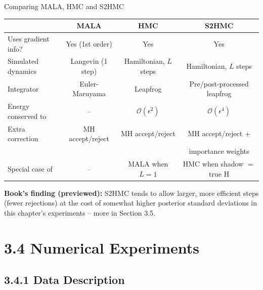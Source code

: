 \documentclass[aspectratio=169,10pt]{beamer}
\newcommand{\Ham}{\mathrm{H}}
\begin{document}
\begin{frame}{Comparing MALA, HMC and S2HMC}
  \begin{table}[]
    \small
    \centering
    \begin{tabular}{lccc}
      \toprule
      & MALA & HMC & S2HMC \\
      \midrule
      Uses gradient info? & Yes (1st order) & Yes & Yes \\
      Simulated dynamics & Langevin (1 step) & Hamiltonian, $L$ steps & Hamiltonian, $L$ steps \\
      Integrator & Euler-Maruyama & Leapfrog & Pre/post-processed leapfrog \\
      Energy conserved to & -- & $\mathcal{O}(\epsilon^2)$ & $\mathcal{O}(\epsilon^4)$ \\
      Extra correction & MH accept/reject & MH accept/reject & MH accept/reject + \\
      & & & \quad importance weights \\
      Special case of & -- & MALA when $L=1$ & HMC when shadow $=$ true $\Ham$ \\
      \bottomrule
    \end{tabular}
  \end{table}
  \textbf{Book's finding (previewed):} S2HMC tends to allow larger, more
  efficient steps (fewer rejections) at the cost of somewhat higher posterior
  standard deviations in this chapter's experiments -- more in Section 3.5.
\end{frame}

\section{3.4 Numerical Experiments}

\subsection{3.4.1 Data Description}
\end{document}
